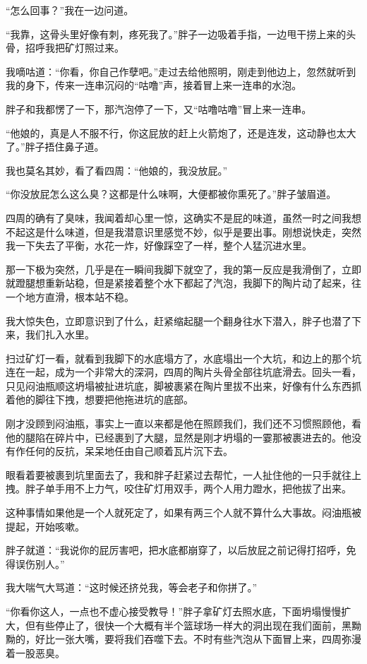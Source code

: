“怎么回事？”我在一边问道。

“我靠，这骨头里好像有刺，疼死我了。”胖子一边吸着手指，一边甩干捞上来的头骨，招呼我把矿灯照过来。

我嘀咕道：“你看，你自己作孽吧。”走过去给他照明，刚走到他边上，忽然就听到我的身下，传来一连串沉闷的“咕噜”声，接着冒上来一连串的水泡。

胖子和我都愣了一下，那汽泡停了一下，又“咕噜咕噜”冒上来一连串。

“他娘的，真是人不服不行，你这屁放的赶上火箭炮了，还是连发，这动静也太大了。”胖子捂住鼻子道。

我也莫名其妙，看了看四周：“他娘的，我没放屁。”

“你没放屁怎么这么臭？这都是什么味啊，大便都被你熏死了。”胖子皱眉道。

四周的确有了臭味，我闻着却心里一惊，这确实不是屁的味道，虽然一时之间我想不起这是什么味道，但是我潜意识里感觉不妙，似乎是要出事。刚想说快走，突然我一下失去了平衡，水花一炸，好像踩空了一样，整个人猛沉进水里。

那一下极为突然，几乎是在一瞬间我脚下就空了，我的第一反应是我滑倒了，立即就蹬腿想重新站稳，但是紧接着整个水下都起了汽泡，我脚下的陶片动了起来，往一个地方直滑，根本站不稳。

我大惊失色，立即意识到了什么，赶紧缩起腿一个翻身往水下潜入，胖子也潜了下来，我们扎入水里。

扫过矿灯一看，就看到我脚下的水底塌方了，水底塌出一个大坑，和边上的那个坑连在一起，成为一个非常大的深洞，四周的陶片头骨全部往坑底滑去。回头一看，只见闷油瓶顺这坍塌被扯进坑底，脚被裹紧在陶片里拔不出来，好像有什么东西抓着他的脚往下拽，想要把他拖进坑的底部。

刚才没顾到闷油瓶，事实上一直以来都是他在照顾我们，我们还不习惯照顾他，看他的腿陷在碎片中，已经裹到了大腿，显然是刚才坍塌的一霎那被裹进去的。他没有作任何的反抗，呆呆地任由自己顺着瓦片沉下去。

眼看着要被裹到坑里面去了，我和胖子赶紧过去帮忙，一人扯住他的一只手就往上拽。胖子单手用不上力气，咬住矿灯用双手，两个人用力蹬水，把他拔了出来。

这种事情如果他是一个人就死定了，如果有两三个人就不算什么大事故。闷油瓶被提起，开始咳嗽。

胖子就道：“我说你的屁厉害吧，把水底都崩穿了，以后放屁之前记得打招呼，免得误伤别人。”

我大喘气大骂道：“这时候还挤兑我，等会老子和你拼了。”

“你看你这人，一点也不虚心接受教导！”胖子拿矿灯去照水底，下面坍塌慢慢扩大，但有些停止了，很快一个大概有半个篮球场一样大的洞出现在我们面前，黑黝黝的，好比一张大嘴，要将我们吞噬下去。不时有些汽泡从下面冒上来，四周弥漫着一股恶臭。

